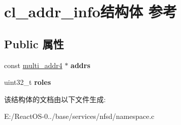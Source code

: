 \hypertarget{structcl__addr__info}{}\section{cl\+\_\+addr\+\_\+info结构体 参考}
\label{structcl__addr__info}
\subsection*{Public 属性}
\begin{DoxyCompactItemize}
\item 
\mbox{\label{structcl__addr__info_a2d83396d2f9049f4a4d4cd165387e9aa}} 
const \hyperlink{struct____multi__addr4}{multi\+\_\+addr4} $\ast$ {\bfseries addrs}
\item 
\mbox{\label{structcl__addr__info_a9b31c332ee780d129e51a39dd97692c3}} 
uint32\+\_\+t {\bfseries roles}
\end{DoxyCompactItemize}


该结构体的文档由以下文件生成\+:\begin{DoxyCompactItemize}
\item 
E\+:/\+React\+O\+S-\/0../base/services/nfsd/namespace.\+c\end{DoxyCompactItemize}
